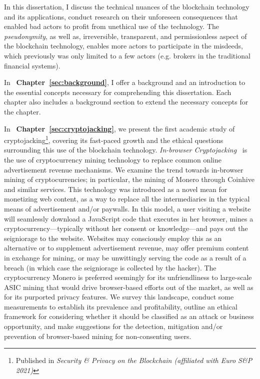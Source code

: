 In this dissertation, I discuss the technical nuances of the blockchain technology and its applications, conduct research on their unforeseen consequences that enabled bad actors to profit from unethical use of the technology. The \textit{pseudonymity}, as well as, irreversible, transparent, and permissionless aspect of the blockchain technology, enables more actors to participate in the misdeeds, which previously was only limited to a few actors (e.g. brokers in the traditional financial systems).

In ~\textbf{Chapter~\ref{sec:background}}, I offer a background and an introduction to the essential concepts necessary for comprehending this dissertation. Each chapter also includes a background section to extend the necessary concepts for the chapter.

In ~\textbf{Chapter~\ref{sec:cryptojacking}}, we present the first academic study of cryptojacking\footnote{Published in \textit{Security {\&} Privacy on the Blockchain (affiliated with Euro S{\&}P 2021)}}, covering its fast-paced growth and the ethical questions surrounding this use of the blockchain technology. \textit{In-browser Cryptojacking}~\cite{eskandari2018first} is the use of cryptocurrency mining technology to replace common online advertisement revenue mechanisms. We examine the trend towards in-browser mining of cryptocurrencies; in particular, the mining of Monero through Coinhive and similar services. This technology was introduced as a novel mean for monetizing web content, as a way to replace all the intermediaries in the typical means of advertisement and/or paywalls. In this model, a user visiting a website will seamlessly download a JavaScript code that executes in her browser, mines a cryptocurrency---typically without her consent or knowledge---and pays out the seigniorage to the website. Websites may consciously employ this as an alternative or to supplement advertisement revenue, may offer premium content in exchange for mining, or may be unwittingly serving the code as a result of a breach (in which case the seigniorage is collected by the hacker). The cryptocurrency Monero is preferred seemingly for its unfriendliness to large-scale ASIC mining that would drive browser-based efforts out of the market, as well as for its purported privacy features. We survey this landscape, conduct some measurements to establish its prevalence and profitability, outline an ethical framework for considering whether it should be classified as an attack or business opportunity, and make suggestions for the detection, mitigation and/or prevention of browser-based mining for non-consenting users.


